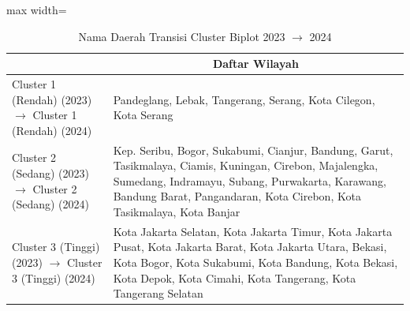 \begin{table}[H]
\centering
\caption{Nama Daerah Transisi Cluster Biplot 2023 \(\rightarrow\) 2024} \label{tab:app1biplot_trans_name_2023x2024}
\begin{adjustbox}{max width=\textwidth}
\begin{tabular}{|>{\centering\arraybackslash}p{4cm}|p{10cm}|}
\hline
\multicolumn{1}{|c|}{\textbf{Kategori}} & \multicolumn{1}{c|}{\textbf{Daftar Wilayah}} \\
\hline
Cluster 1 (Rendah) (2023) \(\rightarrow\) Cluster 1 (Rendah) (2024) & Pandeglang, Lebak, Tangerang, Serang, Kota Cilegon, Kota Serang \\
\hline
Cluster 2 (Sedang) (2023) \(\rightarrow\) Cluster 2 (Sedang) (2024) & Kep. Seribu, Bogor, Sukabumi, Cianjur, Bandung, Garut, Tasikmalaya, Ciamis, Kuningan, Cirebon, Majalengka, Sumedang, Indramayu, Subang, Purwakarta, Karawang, Bandung Barat, Pangandaran, Kota Cirebon, Kota Tasikmalaya, Kota Banjar \\
\hline
Cluster 3 (Tinggi) (2023) \(\rightarrow\) Cluster 3 (Tinggi) (2024) & Kota Jakarta Selatan, Kota Jakarta Timur, Kota Jakarta Pusat, Kota Jakarta Barat, Kota Jakarta Utara, Bekasi, Kota Bogor, Kota Sukabumi, Kota Bandung, Kota Bekasi, Kota Depok, Kota Cimahi, Kota Tangerang, Kota Tangerang Selatan \\
\hline
\end{tabular}
\end{adjustbox}
\end{table}